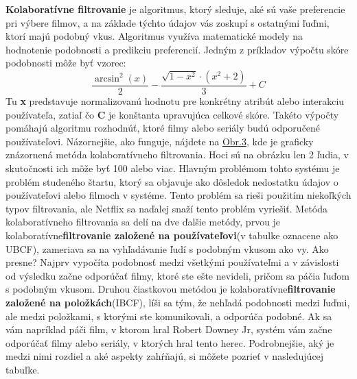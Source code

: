 \documentclass[10pt,slovak,a4paper]{article}
\begin{document}
\textbf{Kolaboratívne filtrovanie} je algoritmus, ktorý sleduje, aké sú vaše preferencie pri výbere filmov, a na základe týchto údajov vás zoskupí s ostatnými ľuďmi, ktorí majú podobný vkus. Algoritmus využíva matematické modely na hodnotenie podobnosti a predikciu preferencií. Jedným z príkladov výpočtu skóre podobnosti môže byť vzorec: 
\[
\frac{\arcsin^2(x)}{2} - \frac{\sqrt{1 - x^2} \cdot (x^2 + 2)}{3} + C
\]
Tu \textbf{x} predstavuje normalizovanú hodnotu pre konkrétny atribút alebo interakciu používateľa, zatiaľ čo \textbf{C} je konštanta upravujúca celkové skóre. Takéto výpočty pomáhajú algoritmu rozhodnúť, ktoré filmy alebo seriály budú odporučené používateľovi. Názornejšie, ako funguje, nájdete na \hyperref[U:I]{Obr.3}, kde je graficky znázornená metóda kolaboratívneho filtrovania. Hoci sú na obrázku len 2 ľudia, v skutočnosti ich môže byť 100 alebo viac.\cite{Coll:fil} Hlavným problémom tohto systému je problém studeného štartu, ktorý sa objavuje ako dôsledok nedostatku údajov o používateľovi alebo filmoch v systéme. Tento problém sa rieši použitím niekoľkých typov filtrovania, ale Netflix sa naďalej snaží tento problém vyriešiť. Metóda kolaboratívneho filtrovania sa delí na dve ďalšie metódy, prvou je kolaboratívne\textbf{filtrovanie založené na používateľovi}(v tabulke oznacene ako UBCF), zameriava sa na vyhľadávanie ľudí s podobným vkusom ako vy.\cite{Fil:alg:colab} Ako presne? Najprv vypočíta podobnosť medzi všetkými používateľmi a v závislosti od výsledku začne odporúčať filmy, ktoré ste ešte nevideli, pričom sa páčia ľuďom s podobným vkusom.
Druhou čiastkovou metódou je kolaboratívne\textbf{filtrovanie založené na položkách}(IBCF), líši sa tým, že nehľadá podobnosti medzi ľuďmi, ale medzi položkami, s ktorými ste komunikovali, a odporúča podobné. Ak sa vám napríklad páči film, v ktorom hral Robert Downey Jr, systém vám začne odporúčať filmy alebo seriály, v ktorých hral tento herec.
Podrobnejšie, aký je medzi nimi rozdiel a aké aspekty zahŕňajú, si môžete pozrieť v nasledujúcej tabuľke.
\end{document}

